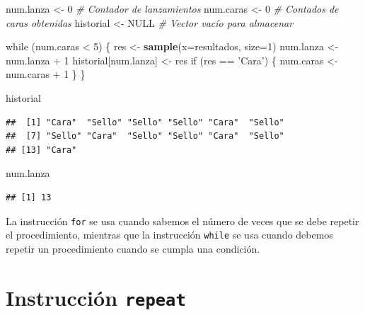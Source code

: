 \documentclass[10pt,]{krantz}
\makeatletter
\newenvironment{Shaded}{\begin{snugshade}}{\end{snugshade}}
\newcommand{\KeywordTok}[1]{\textcolor[rgb]{0.13,0.29,0.53}{\textbf{{#1}}}}
\newcommand{\DataTypeTok}[1]{\textcolor[rgb]{0.13,0.29,0.53}{{#1}}}
\newcommand{\DecValTok}[1]{\textcolor[rgb]{0.00,0.00,0.81}{{#1}}}
\newcommand{\StringTok}[1]{\textcolor[rgb]{0.31,0.60,0.02}{{#1}}}
\newcommand{\CommentTok}[1]{\textcolor[rgb]{0.56,0.35,0.01}{\textit{{#1}}}}
\newcommand{\OtherTok}[1]{\textcolor[rgb]{0.56,0.35,0.01}{{#1}}}
\newcommand{\NormalTok}[1]{{#1}}
\newenvironment{kframe}{%
\medskip{}
\setlength{\fboxsep}{.8em}
 \def\at@end@of@kframe{}%
 \ifinner\ifhmode%
  \def\at@end@of@kframe{\end{minipage}}%
  \begin{minipage}{\columnwidth}%
 \fi\fi%
 \def\FrameCommand##1{\hskip\@totalleftmargin \hskip-\fboxsep
 \colorbox{shadecolor}{##1}\hskip-\fboxsep
     \hskip-\linewidth \hskip-\@totalleftmargin \hskip\columnwidth}%
 \MakeFramed {\advance\hsize-\width
   \@totalleftmargin\z@ \linewidth\hsize
   \@setminipage}}%
 {\par\unskip\endMakeFramed%
 \at@end@of@kframe}
\renewenvironment{Shaded}{\begin{kframe}}{\end{kframe}}
\let\BeginKnitrBlock\begin \let\EndKnitrBlock\end
\makeatother
\begin{document}
\begin{Shaded}
\begin{Highlighting}[]
\NormalTok{num.lanza <-}\StringTok{ }\DecValTok{0}     \CommentTok{# Contador de lanzamientos}
\NormalTok{num.caras <-}\StringTok{ }\DecValTok{0}     \CommentTok{# Contados de caras obtenidas}
\NormalTok{historial <-}\StringTok{ }\OtherTok{NULL}  \CommentTok{# Vector vacío para almacenar}

\NormalTok{while (num.caras <}\StringTok{ }\DecValTok{5}\NormalTok{) \{}
  \NormalTok{res <-}\StringTok{ }\KeywordTok{sample}\NormalTok{(}\DataTypeTok{x=}\NormalTok{resultados, }\DataTypeTok{size=}\DecValTok{1}\NormalTok{)}
  \NormalTok{num.lanza <-}\StringTok{ }\NormalTok{num.lanza +}\StringTok{ }\DecValTok{1}
  \NormalTok{historial[num.lanza] <-}\StringTok{ }\NormalTok{res}
  \NormalTok{if (res ==}\StringTok{ 'Cara'}\NormalTok{) \{}
    \NormalTok{num.caras <-}\StringTok{ }\NormalTok{num.caras +}\StringTok{ }\DecValTok{1}
  \NormalTok{\}}
\NormalTok{\}}

\NormalTok{historial}
\end{Highlighting}
\end{Shaded}

\begin{verbatim}
##  [1] "Cara"  "Sello" "Sello" "Sello" "Cara"  "Sello"
##  [7] "Sello" "Cara"  "Sello" "Sello" "Cara"  "Sello"
## [13] "Cara"
\end{verbatim}

\begin{Shaded}
\begin{Highlighting}[]
\NormalTok{num.lanza}
\end{Highlighting}
\end{Shaded}

\begin{verbatim}
## [1] 13
\end{verbatim}

\BeginKnitrBlock{rmdnote}
La instrucción \texttt{for} se usa cuando sabemos el número de veces que
se debe repetir el procedimiento, mientras que la instrucción
\texttt{while} se usa cuando debemos repetir un procedimiento cuando se
cumpla una condición.
\EndKnitrBlock{rmdnote}

\section{\texorpdfstring{Instrucción \texttt{repeat}
}{Instrucción repeat }}\label{instruccion-repeat}
\end{document}
